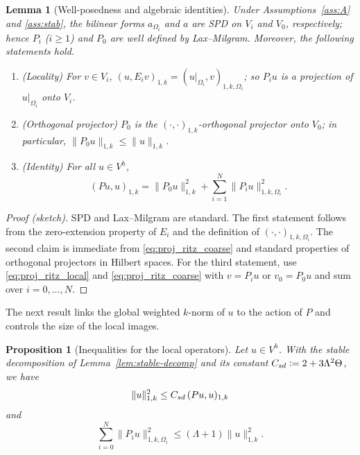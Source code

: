 \documentclass[preprint,3p,times]{elsarticle}
\newcommand{\assign}{\mathrel{\mathop:}=}
\newcommand{\Csd}{C_{\textup{\textsf{sd}}}}
\newtheorem{lemma}[theorem]{Lemma}
\newtheorem{proposition}[theorem]{Proposition}
\theoremstyle{definition}
\numberwithin{equation}{section}
\begin{document}
\begin{lemma}[Well-posedness and algebraic identities]\label{lem:ritz-properties}
Under Assumptions~\ref{ass:A} and \ref{ass:stab}, the bilinear forms $a_{\Omega_i}$ and $a$ are SPD on $V_i$ and $V_0$, respectively; 
hence $P_i$ \textup{(}$i\ge 1$\textup{)} and $P_0$ are well defined by Lax--Milgram.  Moreover, the following statements hold.
\begin{enumerate}
\item (Locality) 
	For $v\in V_i$, $(u,E_i v)_{1, k}=(u|_{\Omega_i},v)_{1, k, \Omega_i}$; so $P_iu$ is a projection of $u|_{\Omega_i}$ onto $V_i$.
\item (Orthogonal projector) 
	$P_0$ is the $(\cdot, \cdot)_{1,k}$-orthogonal projector onto $V_0$; in particular, $\|P_0 u\|_{1, k} \le \|u\|_{1, k}$.
\item (Identity) 
	For all $u\in V^h$,
	\begin{equation}\label{eq:energy-identity}
		(Pu,u)_{1, k} = \|P_0 u\|_{1, k}^2 + \sum_{i=1}^N \|P_i u\|_{1, k, \Omega_i}^2 .
	\end{equation}
\end{enumerate}
\end{lemma}

\begin{proof}[Proof (sketch)]
SPD and Lax--Milgram are standard.  
The first statement follows from the zero-extension property of $E_i$ and the definition of $(\cdot , \cdot)_{1, k, \Omega_i}$.
The second claim is immediate from \eqref{eq:proj_ritz_coarse} and standard properties of orthogonal projectors in Hilbert spaces.
For the third statement, use \eqref{eq:proj_ritz_local} and \eqref{eq:proj_ritz_coarse} with $v=P_i u$ or $v_0=P_0 u$ and sum over $i=0,\dots,N$.
\end{proof}

The next result links the global weighted $k$-norm of $u$ to the action of $P$ and controls the size of the local images.

\begin{proposition}[Inequalities for the local operators]\label{prop:ineqp}
Let $u\in V^h$. With the stable decomposition of Lemma~\ref{lem:stable-decomp} and its constant
$\Csd \assign 2+3\Lambda^2\Theta$, we have
\begin{equation}\label{eq:ineq-global}
	\|u\|_{{1,k}}^2 \le \Csd\, (Pu,u)_{1, k}
\end{equation}
and
\begin{equation}\label{eq:ineq-local-sum}
	\sum_{i=0}^N \|P_i u\|_{1, k, \Omega_i}^2 \le (\Lambda+1)\|u\|_{1, k}^2.
\end{equation}
\end{proposition}
\end{document}

